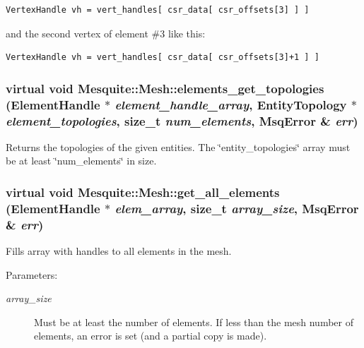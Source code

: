\documentclass[letter]{report}
\begin{document}
\footnotesize\begin{verbatim}VertexHandle vh = vert_handles[ csr_data[ csr_offsets[3] ] ] 
\end{verbatim}\normalsize 


and the second vertex of element \#3 like this: 

\footnotesize\begin{verbatim}VertexHandle vh = vert_handles[ csr_data[ csr_offsets[3]+1 ] ] 
\end{verbatim}\normalsize 
 

\subsubsection{\setlength{\rightskip}{0pt plus 5cm}virtual void Mesquite::Mesh::elements\_\-get\_\-topologies (Element\-Handle $\ast$ {\em element\_\-handle\_\-array}, Entity\-Topology $\ast$ {\em element\_\-topologies}, size\_\-t {\em num\_\-elements}, {\bf Msq\-Error} \& {\em err})\hspace{0.3cm}{\tt  [pure virtual]}}\label{classMesquite_1_1Mesh_a21}


Returns the topologies of the given entities. The \char`\"{}entity\_\-topologies\char`\"{} array must be at least \char`\"{}num\_\-elements\char`\"{} in size. 

\subsubsection{\setlength{\rightskip}{0pt plus 5cm}virtual void Mesquite::Mesh::get\_\-all\_\-elements (Element\-Handle $\ast$ {\em elem\_\-array}, size\_\-t {\em array\_\-size}, {\bf Msq\-Error} \& {\em err})\hspace{0.3cm}{\tt  [pure virtual]}}\label{classMesquite_1_1Mesh_a4}


Fills array with handles to all elements in the mesh.

\begin{Desc}
\item[Parameters: ]\par
\begin{description}
\item[{\em 
array\_\-size}]Must be at least the number of elements. If less than the mesh number of elements, an error is set (and a partial copy is made). \end{description}
\end{Desc}
\end{document}
